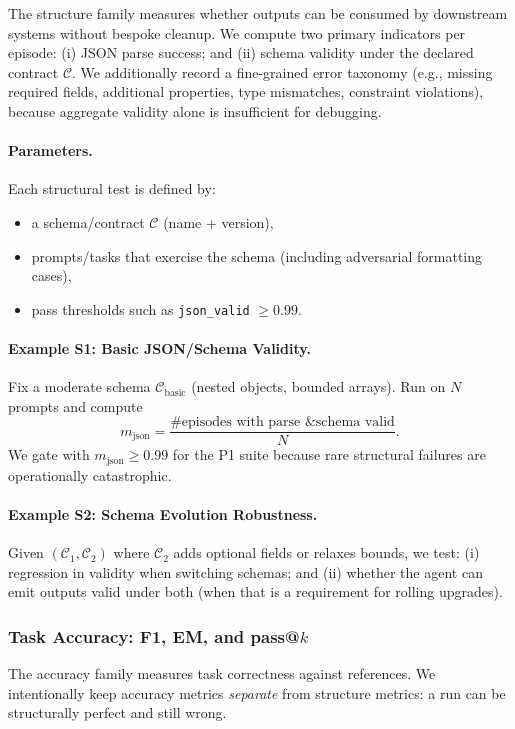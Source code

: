 \documentclass[11pt]{article}
\begin{document}
The structure family measures whether outputs can be consumed by downstream systems without bespoke cleanup.
We compute two primary indicators per episode:
(i) JSON parse success; and (ii) schema validity under the declared contract $\mathcal{C}$.
We additionally record a fine-grained error taxonomy (e.g., missing required fields, additional properties, type mismatches, constraint violations), because aggregate validity alone is insufficient for debugging.

\paragraph{Parameters.}
Each structural test is defined by:
\begin{itemize}[leftmargin=12pt]
    \item a schema/contract $\mathcal{C}$ (name + version),
    \item prompts/tasks that exercise the schema (including adversarial formatting cases),
    \item pass thresholds such as \texttt{json\_valid} $\ge 0.99$.
\end{itemize}

\paragraph{Example S1: Basic JSON/Schema Validity.}
Fix a moderate schema $\mathcal{C}_{\text{basic}}$ (nested objects, bounded arrays).
Run on $N$ prompts and compute
\[
m_{\text{json}} = \frac{\#\text{episodes with parse \& schema valid}}{N}.
\]
We gate with $m_{\text{json}} \ge 0.99$ for the P1 suite because rare structural failures are operationally catastrophic.

\paragraph{Example S2: Schema Evolution Robustness.}
Given $(\mathcal{C}_1,\mathcal{C}_2)$ where $\mathcal{C}_2$ adds optional fields or relaxes bounds, we test:
(i) regression in validity when switching schemas; and (ii) whether the agent can emit outputs valid under both (when that is a requirement for rolling upgrades).

\subsubsection{Task Accuracy: F1, EM, and pass@\texorpdfstring{$k$}{k}}

The accuracy family measures task correctness against references.
We intentionally keep accuracy metrics \emph{separate} from structure metrics: a run can be structurally perfect and still wrong.
\end{document}
